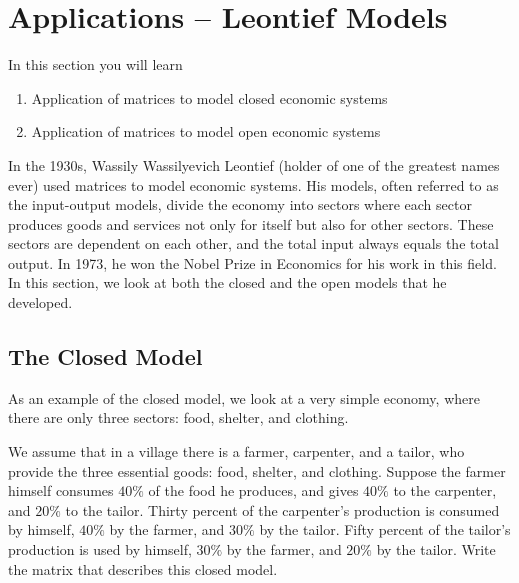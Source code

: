 \section{Applications – Leontief Models}
In this section you will learn
\begin{enumerate}
    \item Application of matrices to model closed economic systems
    \item Application of matrices to model open economic systems
\end{enumerate}

In the 1930s, Wassily Wassilyevich Leontief (holder of one of the greatest names ever) used matrices to model economic systems. His models, often referred to as the input-output models, divide the economy into sectors where each sector produces goods and services not only for itself but also for other sectors. These sectors are dependent on each other, and the total input always equals the total output. In 1973, he won the Nobel Prize in Economics for his work in this field. In this section, we look at both the closed and the open models that he developed.

\subsection{The Closed Model}
As an example of the closed model, we look at a very simple economy, where there are only three sectors: food, shelter, and clothing.


\begin{example} \label{input_output_matrix}
    We assume that in a village there is a farmer, carpenter, and a tailor, who provide the three essential goods: food, shelter, and clothing. Suppose the farmer himself consumes \(40\%\) of the food he produces, and gives \(40\%\) to the carpenter, and \(20\%\) to the tailor. Thirty percent of the carpenter's production is consumed by himself, \(40\%\) by the farmer, and \(30\%\) by the tailor. Fifty percent of the tailor's production is used by himself, \(30\%\) by the farmer, and \(20\%\) by the tailor. Write the matrix that describes this closed model.
\end{example}

